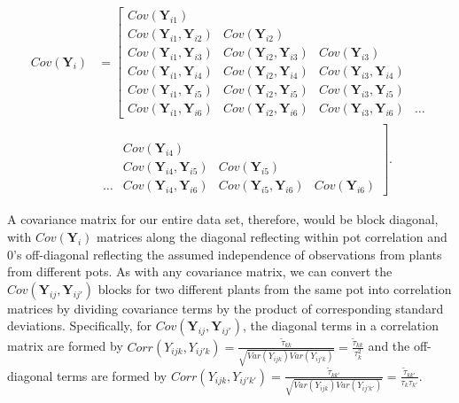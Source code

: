 \documentclass[
]{krantz}
\begin{document}
\begin{align*}
Cov(\textbf{Y}_{i}) & = \left[
          \begin{array}{cccc}
            Cov(\textbf{Y}_{i1}) & & & \\
            Cov(\textbf{Y}_{i1},\textbf{Y}_{i2}) & Cov(\textbf{Y}_{i2}) & & \\
            Cov(\textbf{Y}_{i1},\textbf{Y}_{i3}) & Cov(\textbf{Y}_{i2},\textbf{Y}_{i3}) & Cov(\textbf{Y}_{i3}) & \\
            Cov(\textbf{Y}_{i1},\textbf{Y}_{i4}) & Cov(\textbf{Y}_{i2},\textbf{Y}_{i4}) & Cov(\textbf{Y}_{i3},\textbf{Y}_{i4}) &  \\
            Cov(\textbf{Y}_{i1},\textbf{Y}_{i5}) & Cov(\textbf{Y}_{i2},\textbf{Y}_{i5}) & Cov(\textbf{Y}_{i3},\textbf{Y}_{i5}) &  \\
            Cov(\textbf{Y}_{i1},\textbf{Y}_{i6}) & Cov(\textbf{Y}_{i2},\textbf{Y}_{i6}) & Cov(\textbf{Y}_{i3},\textbf{Y}_{i6}) & \ldots 
          \end{array} \right. \\
 & \left. \begin{array}{cccc} 
      & & &  \\
      & & &  \\
      & & &  \\
 & Cov(\textbf{Y}_{i4}) & &  \\
 & Cov(\textbf{Y}_{i4},\textbf{Y}_{i5}) & Cov(\textbf{Y}_{i5}) & \\
 \ldots & Cov(\textbf{Y}_{i4},\textbf{Y}_{i6}) & Cov(\textbf{Y}_{i5},\textbf{Y}_{i6}) & Cov(\textbf{Y}_{i6})
          \end{array} \right]. 
\end{align*}

A covariance matrix for our entire data set, therefore, would be block diagonal, with \(Cov(\textbf{Y}_{i})\) matrices along the diagonal reflecting within pot correlation and 0's off-diagonal reflecting the assumed independence of observations from plants from different pots. As with any covariance matrix, we can convert the \(Cov(\textbf{Y}_{ij},\textbf{Y}_{ij'})\) blocks for two different plants from the same pot into correlation matrices by dividing covariance terms by the product of corresponding standard deviations. Specifically, for \(Cov(\textbf{Y}_{ij},\textbf{Y}_{ij'})\), the diagonal terms in a correlation matrix are formed by \(Corr(Y_{ijk},Y_{ij'k})=\frac{\tilde{\tau}_{kk}}{\sqrt{Var(Y_{ijk})Var(Y_{ij'k})}}=\frac{\tilde{\tau}_{kk}}{\tau_{k}^{2}}\) and the off-diagonal terms are formed by \(Corr(Y_{ijk},Y_{ij'k'})=\frac{\tilde{\tau}_{kk'}}{\sqrt{Var(Y_{ijk})Var(Y_{ij'k'})}}=\frac{\tilde{\tau}_{kk'}}{\tau_{k}\tau_{k'}}\).
\end{document}
